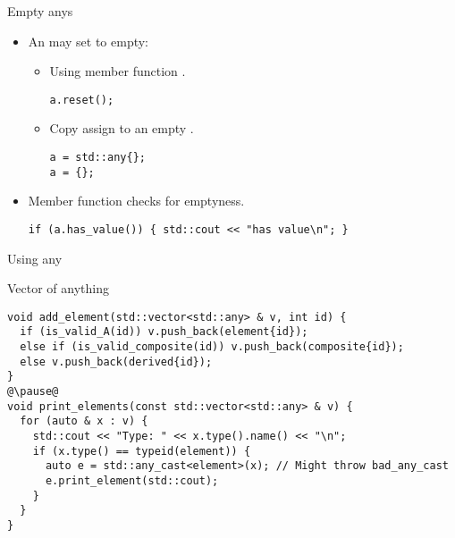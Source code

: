 \begin{frame}[t,fragile]{Empty anys}
\begin{itemize}
  \item An  may set to empty:
  
    \begin{itemize}

      \item Using member function .
\begin{lstlisting}
a.reset();
\end{lstlisting}

      \item Copy assign to an empty .    
\begin{lstlisting}
a = std::any{};
a = {};
\end{lstlisting}

    \end{itemize}

  \item Member function  checks for emptyness.
\begin{lstlisting}
if (a.has_value()) { std::cout << "has value\n"; }
\end{lstlisting}
  
\end{itemize}
\end{frame}

\begin{frame}[t,fragile]{Using any}
\begin{block}{Vector of anything}
\begin{lstlisting}[escapechar=@]
void add_element(std::vector<std::any> & v, int id) {
  if (is_valid_A(id)) v.push_back(element{id});
  else if (is_valid_composite(id)) v.push_back(composite{id});
  else v.push_back(derived{id});
}
@\pause@
void print_elements(const std::vector<std::any> & v) {
  for (auto & x : v) {
    std::cout << "Type: " << x.type().name() << "\n";
    if (x.type() == typeid(element)) {
      auto e = std::any_cast<element>(x); // Might throw bad_any_cast
      e.print_element(std::cout);
    }
  }
}
\end{lstlisting}
\end{block}
\end{frame}

